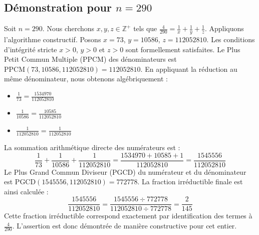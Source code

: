 \documentclass[11pt,a4paper]{article}
\begin{document}
\subsection{Démonstration pour $n = 290$}
Soit $n = 290$. Nous cherchons $x, y, z \in \mathbb{Z}^{+}$ tels que $\frac{4}{290} = \frac{1}{x} + \frac{1}{y} + \frac{1}{z}$.
Appliquons l'algorithme constructif. Posons $x = 73$, $y = 10586$, $z = 112052810$.
Les conditions d'intégrité stricte $x > 0$, $y > 0$ et $z > 0$ sont formellement satisfaites.
Le Plus Petit Commun Multiple (PPCM) des dénominateurs est $\text{PPCM}(73, 10586, 112052810) = 112052810$.
En appliquant la réduction au même dénominateur, nous obtenons algébriquement :
\begin{itemize}
    \item $\frac{1}{73} = \frac{1534970}{112052810}$
    \item $\frac{1}{10586} = \frac{10585}{112052810}$
    \item $\frac{1}{112052810} = \frac{1}{112052810}$
\end{itemize}
La sommation arithmétique directe des numérateurs est :
$$ \frac{1}{73} + \frac{1}{10586} + \frac{1}{112052810} = \frac{1534970 + 10585 + 1}{112052810} = \frac{1545556}{112052810} $$
Le Plus Grand Commun Diviseur (PGCD) du numérateur et du dénominateur est $\text{PGCD}(1545556, 112052810) = 772778$.
La fraction irréductible finale est ainsi calculée :
$$ \frac{1545556}{112052810} = \frac{1545556 \div 772778}{112052810 \div 772778} = \frac{2}{145} $$
Cette fraction irréductible correspond exactement par identification des termes à $\frac{4}{290}$. L'assertion est donc démontrée de manière constructive pour cet entier.
\end{document}
